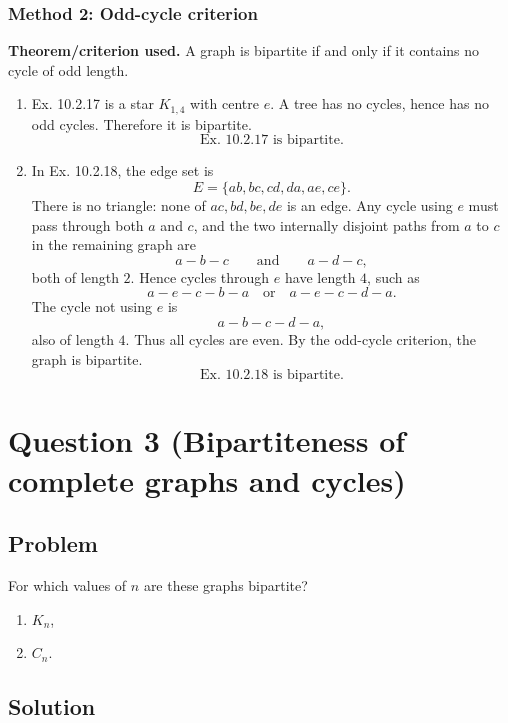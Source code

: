\documentclass[12pt]{article}
\begin{document}
\subsubsection{Method 2: Odd-cycle criterion}
\textbf{Theorem/criterion used.} A graph is bipartite if and only if it contains no cycle of odd length.

\begin{enumerate}[label=(\alph*)]
  \item Ex. 10.2.17 is a star $K_{1,4}$ with centre $e$. A tree has no cycles, hence has no odd cycles. Therefore it is bipartite.
  \[
  \boxed{\text{Ex. 10.2.17 is bipartite.}}
  \]

  \item In Ex. 10.2.18, the edge set is
  \[
  E=\{ab,bc,cd,da,ae,ce\}.
  \]
  There is no triangle: none of $ac,bd,be,de$ is an edge. Any cycle using $e$ must pass through both $a$ and $c$, and the two internally disjoint paths from $a$ to $c$ in the remaining graph are
  \[
  a-b-c\qquad\text{and}\qquad a-d-c,
  \]
  both of length $2$. Hence cycles through $e$ have length $4$, such as
  \[
  a-e-c-b-a
  \quad\text{or}\quad
  a-e-c-d-a.
  \]
  The cycle not using $e$ is
  \[
  a-b-c-d-a,
  \]
  also of length $4$. Thus all cycles are even. By the odd-cycle criterion, the graph is bipartite.
  \[
  \boxed{\text{Ex. 10.2.18 is bipartite.}}
  \]
\end{enumerate}

\newpage
\section{Question 3 (Bipartiteness of complete graphs and cycles)}

\subsection{Problem}
For which values of $n$ are these graphs bipartite?
\begin{enumerate}[label=(\alph*)]
  \item $K_n$,
  \item $C_n$.
\end{enumerate}

\subsection{Solution}
\end{document}
